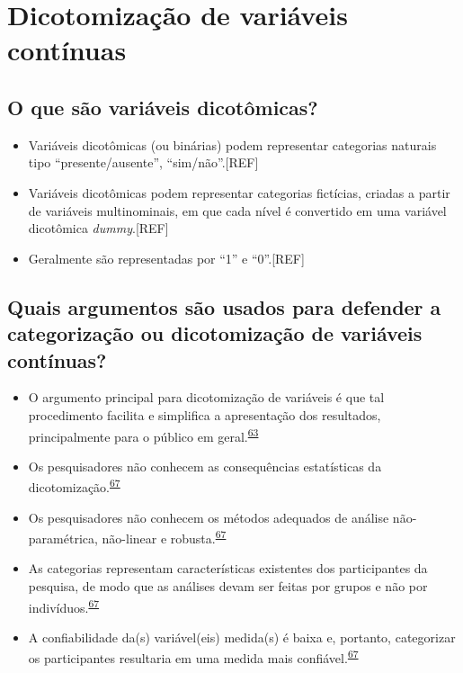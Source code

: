 \documentclass[
  a4paper,
]{book}
\begin{document}
\hypertarget{dicotomizacao}{%
\section{Dicotomização de variáveis contínuas}\label{dicotomizacao}}

\hypertarget{o-que-suxe3o-variuxe1veis-dicotuxf4micas}{%
\subsection{O que são variáveis dicotômicas?}\label{o-que-suxe3o-variuxe1veis-dicotuxf4micas}}

\begin{itemize}
\item
  Variáveis dicotômicas (ou binárias) podem representar categorias naturais tipo ``presente/ausente'', ``sim/não''.{[}REF{]}
\item
  Variáveis dicotômicas podem representar categorias fictícias, criadas a partir de variáveis multinominais, em que cada nível é convertido em uma variável dicotômica \emph{dummy}.{[}REF{]}
\item
  Geralmente são representadas por ``1'' e ``0''.{[}REF{]}
\end{itemize}

\hypertarget{quais-argumentos-suxe3o-usados-para-defender-a-categorizauxe7uxe3o-ou-dicotomizauxe7uxe3o-de-variuxe1veis-contuxednuas}{%
\subsection{Quais argumentos são usados para defender a categorização ou dicotomização de variáveis contínuas?}\label{quais-argumentos-suxe3o-usados-para-defender-a-categorizauxe7uxe3o-ou-dicotomizauxe7uxe3o-de-variuxe1veis-contuxednuas}}

\begin{itemize}
\item
  O argumento principal para dicotomização de variáveis é que tal procedimento facilita e simplifica a apresentação dos resultados, principalmente para o público em geral.\textsuperscript{\protect\hyperlink{ref-Fedorov2009}{63}}
\item
  Os pesquisadores não conhecem as consequências estatísticas da dicotomização.\textsuperscript{\protect\hyperlink{ref-MacCallum2002}{67}}
\item
  Os pesquisadores não conhecem os métodos adequados de análise não-paramétrica, não-linear e robusta.\textsuperscript{\protect\hyperlink{ref-MacCallum2002}{67}}
\item
  As categorias representam características existentes dos participantes da pesquisa, de modo que as análises devam ser feitas por grupos e não por indivíduos.\textsuperscript{\protect\hyperlink{ref-MacCallum2002}{67}}
\item
  A confiabilidade da(s) variável(eis) medida(s) é baixa e, portanto, categorizar os participantes resultaria em uma medida mais confiável.\textsuperscript{\protect\hyperlink{ref-MacCallum2002}{67}}
\end{itemize}
\end{document}
